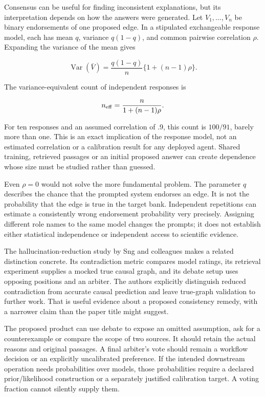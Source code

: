Consensus can be useful for finding inconsistent explanations, but its
interpretation depends on how the answers were generated. Let
\(V_1,\ldots,V_n\) be binary endorsements of one proposed edge. In a
stipulated exchangeable response model, each has mean \(q\), variance
\(q(1-q)\), and common pairwise correlation \(\rho\). Expanding the
variance of the mean gives

\[
 \operatorname{Var}(\bar V)
 =\frac{q(1-q)}{n}\{1+(n-1)\rho\}.
\]

The variance-equivalent count of independent responses is

\[
 n_{\rm eff}=\frac{n}{1+(n-1)\rho}.
\]

For ten responses and an assumed correlation of .9, this count is
\(100/91\), barely more than one. This is an exact implication of the
response model, not an estimated correlation or a calibration result for
any deployed agent. Shared training, retrieved passages or an initial
proposed answer can create dependence whose size must be studied rather
than guessed. \citep{exec13_diagram_examples}

Even \(\rho=0\) would not solve the more fundamental problem. The
parameter \(q\) describes the chance that the prompted system endorses
an edge. It is not the probability that the edge is true in the target
bank. Independent repetitions can estimate a consistently wrong
endorsement probability very precisely. Assigning different role names
to the same model changes the prompts; it does not establish either
statistical independence or independent access to scientific evidence.

The hallucination-reduction study by Sng and colleagues makes a related
distinction concrete. Its contradiction metric compares model ratings,
its retrieval experiment supplies a mocked true causal graph, and its
debate setup uses opposing positions and an arbiter. The authors
explicitly distinguish reduced contradiction from accurate causal
prediction and leave true-graph validation to further work. That is
useful evidence about a proposed consistency remedy, with a narrower
claim than the paper title might suggest. \citep{exec13_hallucination}

The proposed product can use debate to expose an omitted assumption, ask
for a counterexample or compare the scope of two sources. It should
retain the actual reasons and original passages. A final arbiter's vote
should remain a workflow decision or an explicitly uncalibrated
preference. If the intended downstream operation needs probabilities
over models, those probabilities require a declared prior/likelihood
construction or a separately justified calibration target. A voting
fraction cannot silently supply them.

